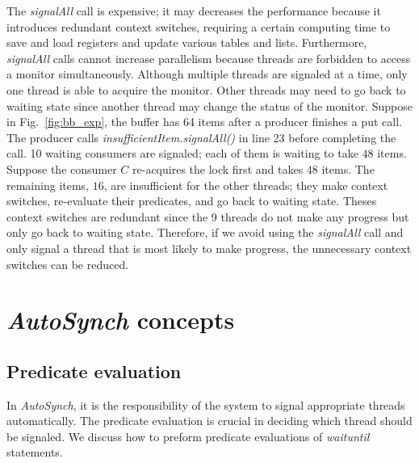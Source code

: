 \documentclass[preprint]{sigplanconf}
\begin{document}
The {\em signalAll} call is expensive; it may decreases the performance because 
it introduces redundant context switches, requiring a certain 
computing time to save and load registers and update various tables and lists.
Furthermore, {\em signalAll} calls cannot increase parallelism because threads
are forbidden to access a monitor simultaneously. Although multiple threads are
signaled at a time, only one thread is able to acquire the monitor. Other 
threads may need to go back to waiting state since another thread may change 
the status of the monitor. Suppose in Fig.~\ref{fig:bb_exp}, the 
buffer has 64 items after a producer finishes a put call. The producer calls 
{\em insufficientItem.signalAll()} in line 23 before completing the call. 10  
waiting consumers are signaled; each of them is waiting to take $48$ items.
Suppose the consumer $C$ re-acquires the lock first and takes $48$ items. The
remaining items, $16$, are insufficient for the other threads; they
make context switches, re-evaluate their predicates, and go back to waiting 
state. Theses context switches are redundant since the 9 threads do not 
make any progress but only go back to waiting state. 
Therefore, if we avoid using the {\em signalAll} call and only signal a thread that 
is most likely to make progress, the unnecessary context switches can be
reduced.



\section{{\em AutoSynch} concepts} \label{sec:concept}


\subsection{Predicate evaluation} \label{sec:globalization}
In {\em AutoSynch}, it is the responsibility of the system to signal appropriate 
threads automatically. The predicate evaluation is crucial in deciding which
thread should be signaled. We discuss how to preform predicate evaluations
of {\em waituntil} statements. 
\end{document}
